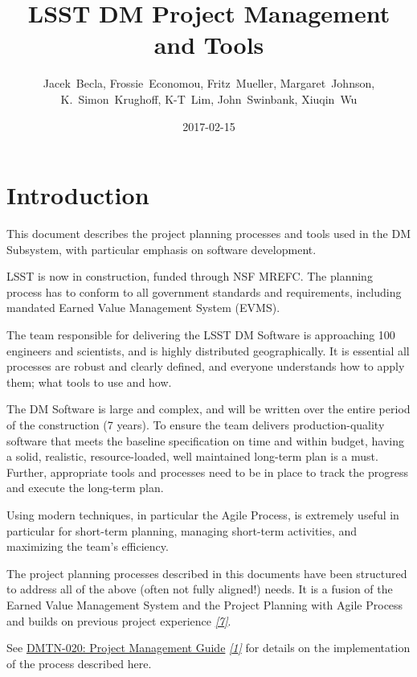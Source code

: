 \documentclass[DM,toc,obsolete]{lsstdoc}
\title[LSST DM Project Management and Tools]{LSST DM Project Management and Tools}
\author{Jacek~Becla, Frossie~Economou, Fritz~Mueller, Margaret~Johnson, K.~Simon~Krughoff, K-T~Lim, John~Swinbank, Xiuqin~Wu}
\date{2017-02-15}
\newcommand{\sphinxcrossref}[1]{\emph{#1}}
\newenvironment{sphinxnote}[1]
  {\begin{tcolorbox}[colback=sphinxnoteBgColor,title=#1]}{\end{tcolorbox}}
\begin{document}
\maketitle

\section{Introduction}
\label{\detokenize{index:id1}}\label{\detokenize{index:change-record}}\label{\detokenize{index:intro}}\label{\detokenize{index:introduction}}
This document describes the project planning processes and tools used in the
DM Subsystem, with particular emphasis on software development.

LSST is now in construction, funded through NSF MREFC. The planning process has
to conform to all government standards and requirements, including mandated
Earned Value Management System (EVMS).

The team responsible for delivering the LSST DM Software is approaching 100 engineers and
scientists, and is highly distributed geographically. It is essential all processes are robust
and clearly defined, and everyone understands how to apply them; what tools to use and how.

The DM Software is large and complex, and will be written over the entire period of
the construction (7 years). To ensure the team delivers production-quality software
that meets the baseline specification on time and within budget, having a solid, realistic,
resource-loaded, well maintained long-term plan is a must. Further,
appropriate tools and processes need to be in place to track the progress and
execute the long-term plan.

Using modern techniques, in particular the Agile Process, is extremely useful in particular
for short-term planning, managing short-term activities, and maximizing
the team's efficiency.

The project planning processes described in this documents have been structured to
address all of the above (often not fully aligned!) needs. It is a fusion of
the Earned Value Management System and the Project Planning with Agile Process and builds
on previous project experience \label{\detokenize{index:id2}}{\hyperref[\detokenize{index:spie-9911e-0nk}]{\sphinxcrossref{{[}7{]}}}}.

\begin{sphinxnote}{Note:}
See \href{https://dmtn-020.lsst.io}{DMTN-020: Project Management Guide} \label{\detokenize{index:id3}}{\hyperref[\detokenize{index:dmtn-020}]{\sphinxcrossref{{[}1{]}}}} for
details on the implementation of the process described here.
\end{sphinxnote}
\end{document}
